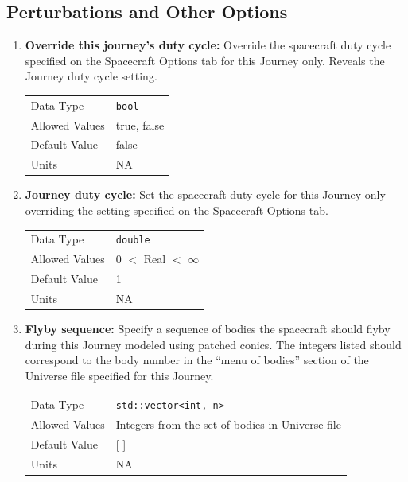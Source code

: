 \subsection{Perturbations and Other Options}
    \label{sec:journey_perturbations}
    \begin{enumerate}    
    
    \item \textbf{Override this journey's duty cycle:} Override the spacecraft duty cycle specified on the Spacecraft Options tab for this Journey only. Reveals the Journey duty cycle setting.

    \begin{table}[H]
        \hspace{2cm}
        \begin{tabular}{ll}
        Data Type & \verb|bool| \\
        Allowed Values & true, false \\
        Default Value & false \\
        Units & NA
        \end{tabular}
    \end{table}

    \item \textbf{Journey duty cycle:} Set the spacecraft duty cycle for this Journey only overriding the setting specified on the Spacecraft Options tab.

        \begin{table}[H]
            \hspace{2cm}
            \begin{tabular}{ll}
            Data Type & \verb|double| \\
            Allowed Values & 0 $<$ Real $<$ $\infty$ \\
            Default Value & 1\\
            Units & NA
            \end{tabular}
        \end{table}

    \item \textbf{Flyby sequence:} Specify a sequence of bodies the spacecraft should flyby during this Journey modeled using patched conics. The integers listed should correspond to the body number in the ``menu of bodies'' section of the Universe file specified for this Journey.

        \begin{table}[H]
            \hspace{2cm}
            \begin{tabular}{ll}
            Data Type & \verb|std::vector<int, n>| \\
            Allowed Values & Integers from the set of bodies in Universe file \\
            Default Value & [ ] \\
            Units & NA
            \end{tabular}
        \end{table}


\end{enumerate}
